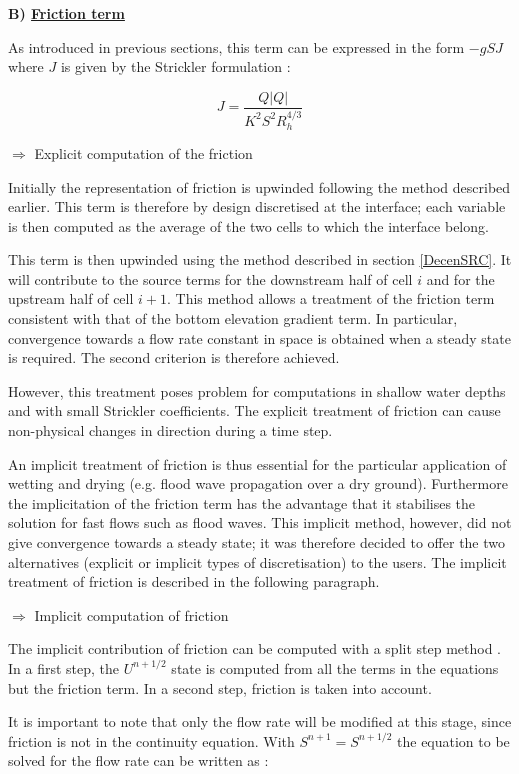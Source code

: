 \textbf{B) \underline{Friction term}}

As introduced in previous sections, this term can be expressed in the form  $-g S J$ where $J$ is given by the Strickler formulation :

\begin{equation}
 J = \frac{Q|Q|}{K^2 S^2 R_{h}^{4/3}}
\end{equation}

$\Longrightarrow$ Explicit computation of the friction

Initially the representation of friction is upwinded following the method described earlier. This term is therefore by design discretised at the interface; each variable is then computed as the average of the two cells to which the interface belong.

This term is then upwinded using the method described in section \ref{DecenSRC}. It will contribute to the source terms for the downstream half of cell $i$ and for the upstream half of cell $i+1$.
This method allows a treatment of the friction term consistent with that of the bottom elevation gradient term. In particular, convergence towards a flow rate constant in space is obtained when a steady state is required. The second criterion is therefore achieved.

However, this treatment poses problem for computations in shallow water depths and with small Strickler coefficients. The explicit treatment of friction can cause non-physical changes in direction during a time step.

An implicit treatment of friction is thus essential for the particular application of wetting and drying (e.g. flood wave propagation over a dry ground). Furthermore the implicitation of the friction term has the advantage that it stabilises the solution for fast flows such as flood waves. This implicit method, however, did not give convergence towards a steady state; it was therefore decided to offer the two alternatives (explicit or implicit types of discretisation) to the users. The implicit treatment of friction is described in the following paragraph.

$\Longrightarrow$ Implicit computation of friction

The implicit contribution of friction can be computed with a split step method \cite{PAQUIER95}. In a first step, the $U^{n+1/2}$ state is computed from all the terms in the equations but the friction term. In a second step, friction is taken into account.

It is important to note that only the flow rate will be modified at this stage, since friction is not in the continuity equation. With $S^{n+1} = S^{n+1/2}$ the equation to be solved for the flow rate can be written as :

